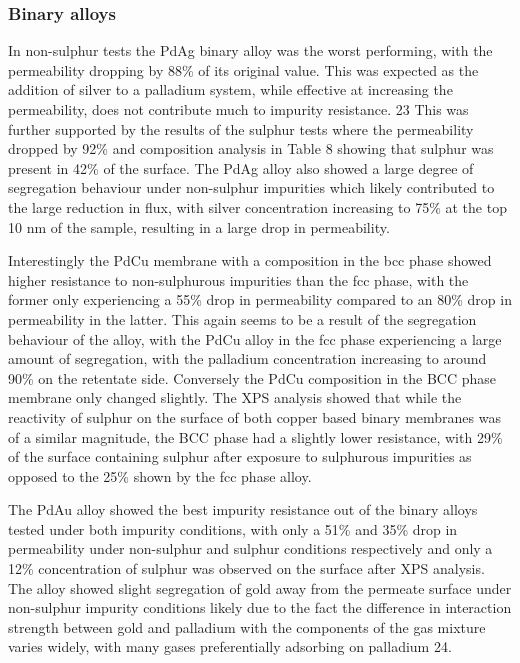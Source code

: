 \subsubsection{Binary alloys}
In non-sulphur tests the PdAg binary alloy was the worst performing, with the permeability dropping by 88\% of its original value. This was expected as the addition of silver to a palladium system, while effective at increasing the permeability, does not contribute much to impurity resistance. 23 This was further supported by the results of the sulphur tests where the permeability dropped by 92\% and composition analysis in Table 8 showing that sulphur was present in 42\% of the surface. The PdAg alloy also showed a large degree of segregation behaviour under non-sulphur impurities which likely contributed to the large reduction in flux, with silver concentration increasing to 75\% at the top 10 nm of the sample, resulting in a large drop in permeability. 

Interestingly the PdCu membrane with a composition in the bcc phase showed higher resistance to non-sulphurous impurities than the fcc phase, with the former only experiencing a 55\% drop in permeability compared to an 80\% drop in permeability in the latter. This again seems to be a result of the segregation behaviour of the alloy, with the PdCu alloy in the fcc phase experiencing a large amount of segregation, with the palladium concentration increasing to around 90\% on the retentate side. Conversely the PdCu composition in the BCC phase membrane only changed slightly. The XPS analysis showed that while the reactivity of sulphur on the surface of both copper based binary membranes was of a similar magnitude, the BCC phase had a slightly lower resistance, with 29\% of the surface containing sulphur after exposure to sulphurous impurities as opposed to the 25\% shown by the fcc phase alloy.

The PdAu alloy showed the best impurity resistance out of the binary alloys tested under both impurity conditions, with only a 51\% and 35\% drop in permeability under non-sulphur and sulphur conditions respectively and only a 12\% concentration of sulphur was observed on the surface after XPS analysis. The alloy showed slight segregation of gold away from the permeate surface under non-sulphur impurity conditions likely due to the fact the difference in interaction strength between gold and palladium with the components of the gas mixture varies widely, with many gases preferentially adsorbing on palladium 24.

